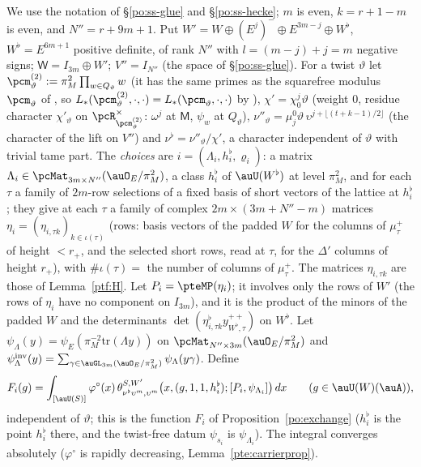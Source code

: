 \documentclass[10pt]{amsart}
\theoremstyle{definition}
\theoremstyle{remark}
\begin{document}
We use the notation of \S\ref{po:ss-glue} and \S\ref{po:ss-hecke}; $m$ is even, $k=r+1-m$ is even, and
$N''=r+9m+1$. Put $W'=W\oplus(E^j)^-\oplus E^{3m-j}\oplus W^\flat$, $W^\flat=E^{6m+1}$ positive definite,
of rank $N''$ with $l=(m-j)+j=m$ negative signs; $\mathsf W=I_{3m}\oplus W'$; $V''=I_{N''}$ (the space of
\S\ref{po:ss-glue}). For a twist $\vartheta$ let $\pcm^{(2)}_\vartheta:=\pi_M^2\prod_{w\in Q_\vartheta}w$ (it has the same primes as the squarefree modulus $\pcm_\vartheta$ of {\cite[\S2.3]{P53}}, so $L_*(\pcm^{(2)}_\vartheta,\cdot,\cdot)=L_*(\pcm_\vartheta,\cdot,\cdot)$ by {\cite[(11)]{P53}}), $\chi'=
\chi_0^j\vartheta$ (weight $0$, residue character $\chi'_\vartheta$ on $\pcR_{\pcm^{(2)}_\vartheta}^\times$: $\omega^j$ at
$\mathsf M$, $\psi_w$ at $Q_\vartheta$), $\nu''_\vartheta=\mu_j^0\vartheta\,\upsilon^{j+\lfloor(t+k-1)/2\rfloor}$ (the
character of the lift on $V''$) and $\nu^\flat=\nu''_\vartheta/\chi'$, a character independent of
$\vartheta$ with trivial tame part. The \emph{choices} are $i=(\Lambda_i,h^\flat_i,\varrho_i)$: a matrix
$\Lambda_i\in\pcMat_{3m\times N''}(\auO_E/\pi_M^2)$, a class $h^\flat_i$ of $\auU(W^\flat)$ at level $\pi_M^2$, and
for each $\tau$ a family of $2m$-row selections of a fixed basis of short vectors of the lattice at
$h^\flat_i$; they give at each $\tau$ a family of complex $2m\times(3m+N''-m)$ matrices $\eta_i=(\eta_{i,\tau k})_{k\in
\iota(\tau)}$ (rows: basis vectors of the padded $W$ for the columns of $\mu^+_\tau$ of height $<r_+$, and the
selected short rows, read at $\tau$, for the $\Delta'$ columns of height $r_+$), with $\#\iota(\tau)=$ the number
of columns of $\mu^+_\tau$. The matrices $\eta_{i,\tau k}$ are those of Lemma~\ref{ptf:H}. Let $P_i=\pteMP(\eta_i)$; it involves only the rows of $W'$ (the rows of $\eta_i$ have
no component on $I_{3m}$), and it is the product of the minors of the padded $W$ and the determinants
$\det(\eta^\flat_{i,\tau k}y^{++}_{W^\flat,\tau})$ on $W^\flat$. Let $\psi_\Lambda(y)=\psi_E(\pi_M^{-2}\mathrm{tr}(\Lambda y))$
on $\pcMat_{N''\times3m}(\auO_E/\pi_M^2)$ and $\psi^{\mathrm{inv}}_\Lambda(y)=\sum_{\gamma\in\auGL_{3m}(\auO_E/\pi_M^2)}
\psi_\Lambda(y\gamma)$. Define
\begin{equation}\label{pte:eq-F}
F_i(g)=\int_{[\auU(S)]}\varphi^\circ(x)\,\theta^{S,W'}_{\nu^\flat\upsilon^m,\upsilon^m}\bigl(x,(g,1,1,h^\flat_i);
[P_i,\psi_{\Lambda_i}]\bigr)\,dx\qquad(g\in\auU(W)(\auA)),
\end{equation}
independent of $\vartheta$; this is the function $F_i$ of Proposition~\ref{po:exchange}
($h^\flat_i$ is the point $h^\flat_i$ there, and the twist-free datum $\psi_{s_i}$ is $\psi_{\Lambda_i}$). The
integral converges absolutely ($\varphi^\circ$ is rapidly decreasing, Lemma~\ref{pte:carrierprop}).
\end{document}
